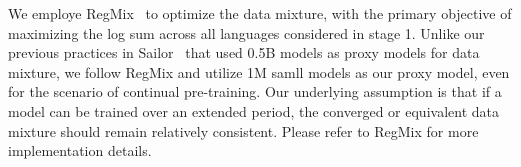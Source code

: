 We employe RegMix~\citep{liu2024regmix} to optimize the data mixture, with the primary objective of maximizing the log sum across all languages considered in stage 1.
Unlike our previous practices in Sailor~\citep{dou-etal-2024-sailor} that used 0.5B models as proxy models for data mixture, we follow RegMix and utilize 1M samll models as our proxy model, even for the scenario of continual pre-training. 
Our underlying assumption is that if a model can be trained over an extended period, the converged or equivalent data mixture should remain relatively consistent.
Please refer to RegMix for more implementation details.
